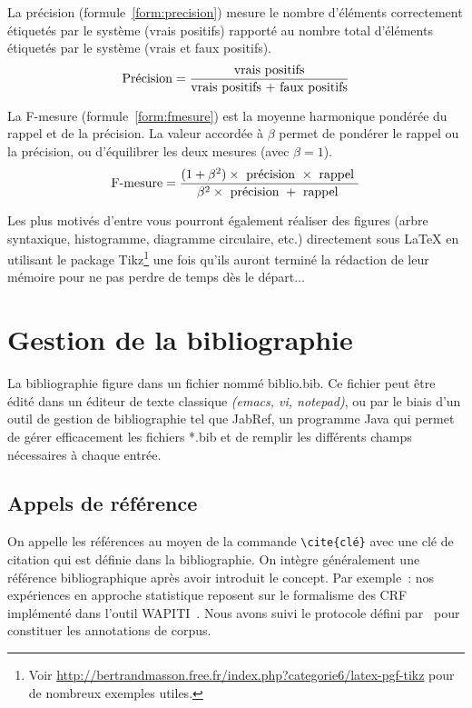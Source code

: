  La précision
(formule~\ref{form:precision}) mesure le nombre d'éléments
correctement étiquetés par le système (vrais positifs) rapporté au
nombre total d'éléments étiquetés par le système (vrais et faux
positifs).
%
\begin{equation}
  \centering
  \text{Précision} = {{\text{vrais positifs}}\over{\text{vrais positifs + faux positifs}}}
  \label{form:precision}
\end{equation}

 La F-mesure (formule~\ref{form:fmesure}) est la
moyenne harmonique pondérée du rappel et de la précision. La valeur
accordée à $\beta$ permet de pondérer le rappel ou la précision, ou
d'équilibrer les deux mesures (avec $\beta=1$).
%
\begin{equation}
  \centering
  \text{F-mesure} = {{(1+\beta^2) \times \text{ précision } \times \text{ rappel }}\over{\beta^2 \times \text{ précision } + \text{ rappel } }}
  \label{form:fmesure}
\end{equation}

Les plus motivés d'entre vous pourront également réaliser des figures
(arbre syntaxique, histogramme, diagramme circulaire, etc.)
directement sous \LaTeX{} en utilisant le package Tikz\footnote{Voir
  \url{http://bertrandmasson.free.fr/index.php?categorie6/latex-pgf-tikz}
  pour de nombreux exemples utiles.} une fois qu'ils auront terminé la
rédaction de leur mémoire pour ne pas perdre de temps dès le départ...



\section{Gestion de la bibliographie}
La  bibliographie figure dans un fichier nommé
\og{}biblio.bib\fg{}. Ce fichier peut être édité dans un éditeur de
texte classique \emph{(emacs, vi, notepad)}, ou par le biais d'un
outil de gestion de bibliographie tel que \textsf{JabRef}, un
programme Java qui permet de gérer efficacement les fichiers *.bib et
de remplir les différents champs nécessaires à chaque entrée.

\subsection{Appels de référence}
On appelle les références au moyen de la
commande \verb+\cite{clé}+ avec une clé de citation qui est définie
dans la bibliographie. On intègre généralement une référence
bibliographique après avoir introduit le concept. Par exemple~: nos
expériences en approche statistique reposent sur le formalisme des
CRF~\cite{lafferty-2001icml} implémenté dans l'outil
WAPITI~\cite{lavergne-2010acl}. Nous avons suivi le protocole défini
par~\cite[p.~3]{grouin-2014jbi} pour constituer les annotations de corpus.

